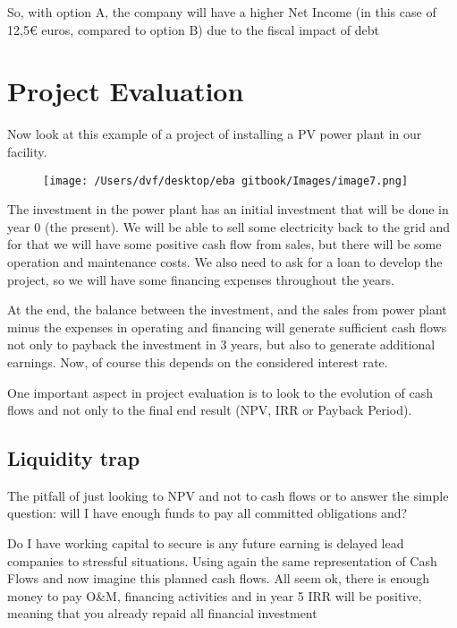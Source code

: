 \documentclass[]{book}
\newcommand{\euro}{€}
\theoremstyle{definition}
\theoremstyle{definition}
\theoremstyle{definition}
\theoremstyle{remark}
\begin{document}
So, with option A, the company will have a higher Net Income (in this
case of 12,5\euro{} euros, compared to option B) due to the fiscal
impact of debt

\section{Project Evaluation}\label{project-evaluation}

Now look at this example of a project of installing a PV power plant in
our facility.

\begin{figure}[htbp]
\centering
\texttt{[image: /Users/dvf/desktop/eba gitbook/Images/image7.png]}
\caption{}
\end{figure}

The investment in the power plant has an initial investment that will be
done in year 0 (the present). We will be able to sell some electricity
back to the grid and for that we will have some positive cash flow from
sales, but there will be some operation and maintenance costs. We also
need to ask for a loan to develop the project, so we will have some
financing expenses throughout the years.

At the end, the balance between the investment, and the sales from power
plant minus the expenses in operating and financing will generate
sufficient cash flows not only to payback the investment in 3 years, but
also to generate additional earnings. Now, of course this depends on the
considered interest rate.

One important aspect in project evaluation is to look to the evolution
of cash flows and not only to the final end result (NPV, IRR or Payback
Period).

\subsection{Liquidity trap}\label{liquidity-trap}

The pitfall of just looking to NPV and not to cash flows or to answer
the simple question: will I have enough funds to pay all committed
obligations and?

Do I have working capital to secure is any future earning is delayed
lead companies to stressful situations. Using again the same
representation of Cash Flows and now imagine this planned cash flows.
All seem ok, there is enough money to pay O\&M, financing activities and
in year 5 IRR will be positive, meaning that you already repaid all
financial investment
\end{document}
